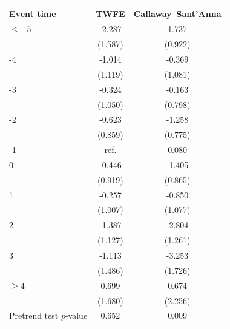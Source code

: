 \begin{tabular}{lcc}
\toprule
Event time & TWFE & Callaway--Sant'Anna \\
\midrule
\(\le -5\) & -2.287 &  1.737 \\
 & (1.587) & (0.922) \\
-4 & -1.014 & -0.369 \\
 & (1.119) & (1.081) \\
-3 & -0.324 & -0.163 \\
 & (1.050) & (0.798) \\
-2 & -0.623 & -1.258 \\
 & (0.859) & (0.775) \\
-1 & \multicolumn{1}{c}{ref.} &  0.080 \\
0 & -0.446 & -1.405 \\
 & (0.919) & (0.865) \\
1 & -0.257 & -0.850 \\
 & (1.007) & (1.077) \\
2 & -1.387 & -2.804 \\
 & (1.127) & (1.261) \\
3 & -1.113 & -3.253 \\
 & (1.486) & (1.726) \\
\(\ge 4\) &  0.699 &  0.674 \\
 & (1.680) & (2.256) \\
\midrule
Pretrend test \(p\)-value & 0.652 & 0.009 \\
\bottomrule
\end{tabular}

